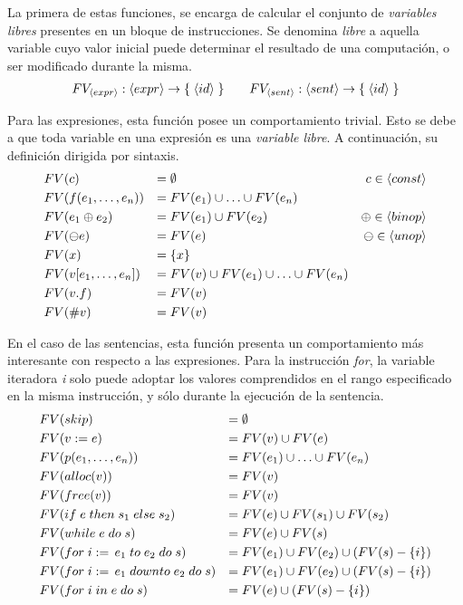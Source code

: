 \documentclass{article}
\begin{document}
La primera de estas funciones, se encarga de calcular el conjunto de \textit{variables libres} presentes en un bloque de instrucciones.
Se denomina \textit{libre} a aquella variable cuyo valor inicial puede determinar el resultado de una computación, o ser modificado durante la misma.
\begin{gather*}
FV_{\langle expr \rangle}: \langle expr \rangle \rightarrow \{ \; \langle id \rangle \; \}
\qquad
FV_{\langle sent \rangle}: \langle sent \rangle \rightarrow \{ \; \langle id \rangle \; \}
\end{gather*}

Para las expresiones, esta función posee un comportamiento trivial.
Esto se debe a que toda variable en una expresión es una \textit{variable libre}.
A continuación, su definición dirigida por sintaxis.
\begin{align*}
&FV(c)
&=&\;
\emptyset
&c \in \langle const \rangle
\\
&FV(f(e_1, \ldots, e_n))
&=&\;
FV(e_1) \cup \ldots \cup FV(e_n)
\\
&FV(e_1 \oplus e_2)
&=&\;
FV(e_1) \cup FV(e_2)
&\oplus \in \langle binop \rangle
\\
&FV(\ominus e)
&=&\;
FV(e)
&\ominus \in \langle unop \rangle
\\
&FV(x)
&=&\;
\{ x \}
\\
&FV(v [e_1, \ldots, e_n])
&=&\;
FV(v) \cup FV(e_1) \cup \ldots \cup FV(e_n)
\\
&FV(v.f)
&=&\;
FV(v)
\\
&FV(\# v)
&=&\;
FV(v)
\end{align*}

En el caso de las sentencias, esta función presenta un comportamiento más interesante con respecto a las expresiones.
Para la instrucción \textit{for}, la variable iteradora \textit{i} solo puede adoptar los valores comprendidos en el rango especificado en la misma instrucción, y sólo durante la ejecución de la sentencia.
\begin{align*}
&FV(skip)
&=&\;
\emptyset
\\
&FV(v := e)
&=&\;
FV(v) \cup FV(e)
\\
&FV(p(e_1, \ldots, e_n))
&=&\;
FV(e_1) \cup \ldots \cup FV(e_n)
\\
&FV(alloc(v))
&=&\;
FV(v)
\\
&FV(free(v))
&=&\;
FV(v)
\\
&FV(if \; e \; then \; s_1 \; else \; s_2)
&=&\;
FV(e) \cup FV(s_1) \cup FV(s_2)
\\
&FV(while \; e \; do \; s)
&=&\;
FV(e) \cup FV(s)
\\
&FV(for \; i := \, e_1 \; to \; e_2 \; do \; s)
&=&\;
FV(e_1) \cup FV(e_2) \cup (FV(s) - \{ i \})
\\
&FV(for \; i := \, e_1 \; downto \; e_2 \; do \; s)
&=&\;
FV(e_1) \cup FV(e_2) \cup (FV(s) - \{ i \})
\\
&FV(for \; i \; in \; e \; do \; s)
&=&\;
FV(e) \cup (FV(s) - \{ i \})
\end{align*}
\end{document}
